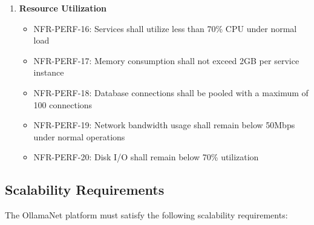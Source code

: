 \begin{enumerate}
   \item \textbf{Resource Utilization}
   \begin{itemize}
      \item NFR-PERF-16: Services shall utilize less than 70\% CPU under normal load
      \item NFR-PERF-17: Memory consumption shall not exceed 2GB per service instance
      \item NFR-PERF-18: Database connections shall be pooled with a maximum of 100 connections
      \item NFR-PERF-19: Network bandwidth usage shall remain below 50Mbps under normal operations
      \item NFR-PERF-20: Disk I/O shall remain below 70\% utilization
   \end{itemize}
\end{enumerate}

\subsection{Scalability Requirements}

The OllamaNet platform must satisfy the following scalability requirements:

